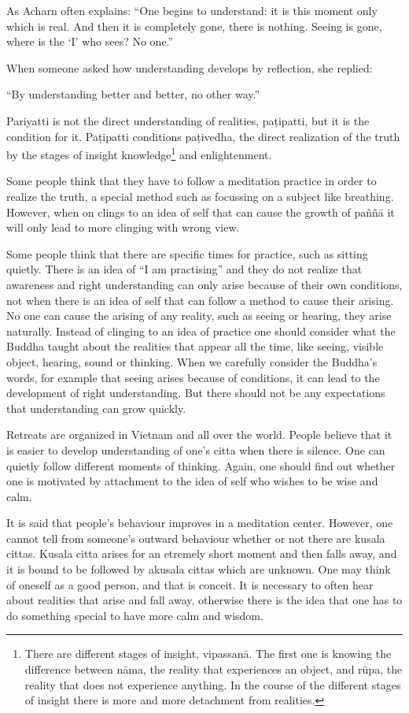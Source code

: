 As Acharn often explains: ``One begins to understand: it is this moment
only which is real. And then it is completely gone, there is nothing.
Seeing is gone, where is the `I' who sees? No one.''

When someone asked how understanding develops by reflection, she
replied:

``By understanding better and better, no other way.''

Pariyatti is not the direct understanding of realities, paṭipatti, but
it is the condition for it. Paṭipatti conditions paṭivedha, the direct
realization of the truth by the stages of insight knowledge\footnote{There are different
stages of insight, vipassanā. The first one is knowing the difference
between nāma, the reality that experiences an object, and rūpa, the
reality that does not experience anything. In the course of the
different stages of insight there is more and more detachment from
realities.} and enlightenment.

Some people think that they have to follow a meditation practice in
order to realize the truth, a special method such as focussing on a
subject like breathing. However, when on clings to an idea of self that
can cause the growth of paññā it will only lead to more clinging with
wrong view.

Some people think that there are specific times for practice, such as
sitting quietly. There is an idea of ``I am practising'' and they do not
realize that awareness and right understanding can only arise because of
their own conditions, not when there is an idea of self that can follow
a method to cause their arising. No one can cause the arising of any
reality, such as seeing or hearing, they arise naturally. Instead of
clinging to an idea of practice one should consider what the Buddha
taught about the realities that appear all the time, like seeing,
visible object, hearing, sound or thinking. When we carefully consider
the Buddha's words, for example that seeing arises because of
conditions, it can lead to the development of right understanding. But
there should not be any expectations that understanding can grow
quickly.

Retreats are organized in Vietnam and all over the world. People believe
that it is easier to develop understanding of one's citta when there is
silence. One can quietly follow different moments of thinking. Again,
one should find out whether one is motivated by attachment to the idea
of self who wishes to be wise and calm.

It is said that people's behaviour improves in a meditation center.
However, one cannot tell from someone's outward behaviour whether or not
there are kusala cittas. Kusala citta arises for an etremely short
moment and then falls away, and it is bound to be followed by akusala
cittas which are unknown. One may think of oneself as a good person, and
that is conceit. It is necessary to often hear about realities that
arise and fall away, otherwise there is the idea that one has to do
something special to have more calm and wisdom.

